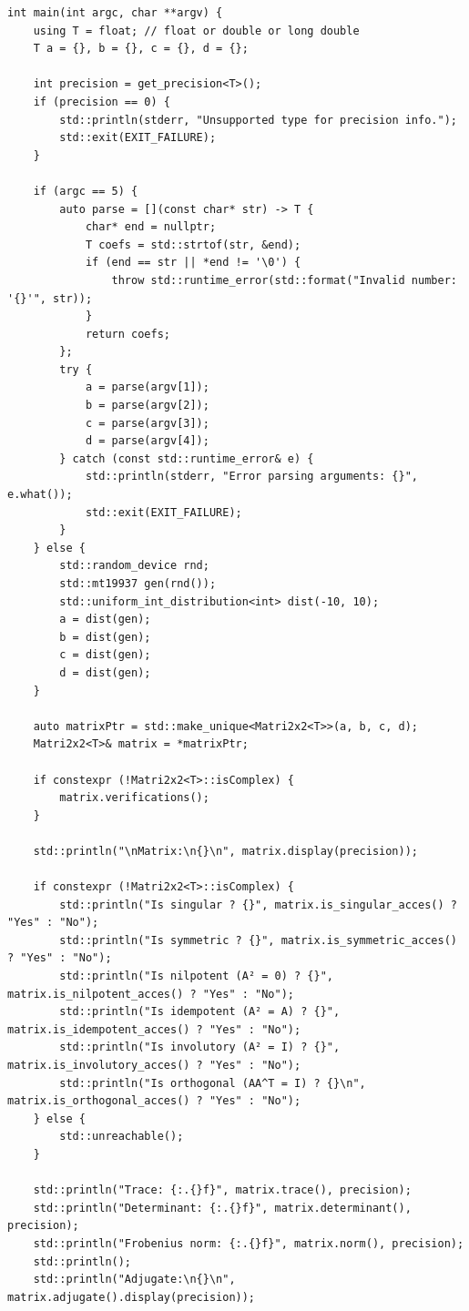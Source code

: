\documentclass[11pt]{article}
\begin{document}
\begin{lstlisting}
int main(int argc, char **argv) {
    using T = float; // float or double or long double
    T a = {}, b = {}, c = {}, d = {};

    int precision = get_precision<T>();
    if (precision == 0) {
        std::println(stderr, "Unsupported type for precision info.");
        std::exit(EXIT_FAILURE);
    }
        
    if (argc == 5) {
        auto parse = [](const char* str) -> T {
            char* end = nullptr;
            T coefs = std::strtof(str, &end);
            if (end == str || *end != '\0') {
                throw std::runtime_error(std::format("Invalid number: '{}'", str));
            }
            return coefs;
        };
        try {
            a = parse(argv[1]);
            b = parse(argv[2]);
            c = parse(argv[3]);
            d = parse(argv[4]);
        } catch (const std::runtime_error& e) {
            std::println(stderr, "Error parsing arguments: {}", e.what());
            std::exit(EXIT_FAILURE);
        }
    } else {
        std::random_device rnd;
        std::mt19937 gen(rnd());
        std::uniform_int_distribution<int> dist(-10, 10);
        a = dist(gen);
        b = dist(gen);
        c = dist(gen);
        d = dist(gen);
    }

    auto matrixPtr = std::make_unique<Matri2x2<T>>(a, b, c, d);
    Matri2x2<T>& matrix = *matrixPtr;
    
    if constexpr (!Matri2x2<T>::isComplex) {
        matrix.verifications();
    }

    std::println("\nMatrix:\n{}\n", matrix.display(precision));
    
    if constexpr (!Matri2x2<T>::isComplex) {
        std::println("Is singular ? {}", matrix.is_singular_acces() ? "Yes" : "No");
        std::println("Is symmetric ? {}", matrix.is_symmetric_acces() ? "Yes" : "No");
        std::println("Is nilpotent (A² = 0) ? {}", matrix.is_nilpotent_acces() ? "Yes" : "No");
        std::println("Is idempotent (A² = A) ? {}", matrix.is_idempotent_acces() ? "Yes" : "No");
        std::println("Is involutory (A² = I) ? {}", matrix.is_involutory_acces() ? "Yes" : "No");
        std::println("Is orthogonal (AA^T = I) ? {}\n", matrix.is_orthogonal_acces() ? "Yes" : "No");
    } else {
        std::unreachable();
    }
    
    std::println("Trace: {:.{}f}", matrix.trace(), precision);
    std::println("Determinant: {:.{}f}", matrix.determinant(), precision);
    std::println("Frobenius norm: {:.{}f}", matrix.norm(), precision);
    std::println();
    std::println("Adjugate:\n{}\n", matrix.adjugate().display(precision));


\end{lstlisting}
\end{document}

